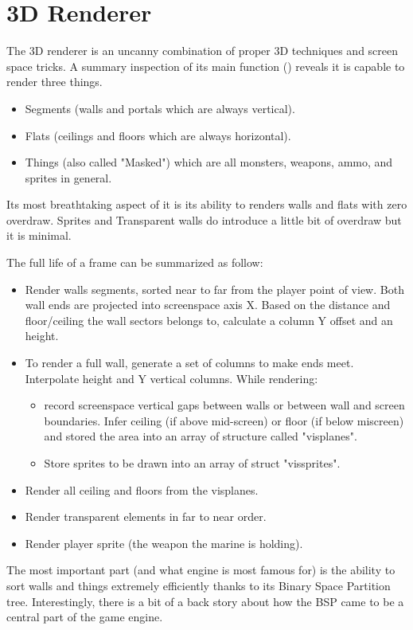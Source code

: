 \section{3D Renderer}
The 3D renderer is an uncanny combination of proper 3D techniques and screen space tricks. A summary inspection of its main function () reveals it is capable to render three things.\\
\par
{}
\par
\begin{itemize}
	\item Segments (walls and portals which are always vertical).
	\item Flats (ceilings and floors which are always horizontal).
	\item Things (also called "Masked") which are all monsters, weapons, ammo, and sprites in general.
\end{itemize}
 Its most breathtaking aspect of it is its ability to renders walls and flats with zero overdraw. Sprites and Transparent walls do introduce a little bit of overdraw but it is minimal.\\
\par
The full life of a frame can be summarized as follow:
\begin{itemize}
\item Render walls segments, sorted near to far from the player point of view. Both wall ends are projected into screenspace axis X. Based on the distance and floor/ceiling the wall sectors belongs to, calculate a column Y offset and an height. 
\item To render a full wall, generate a set of columns to make ends meet. Interpolate height and Y vertical columns. While rendering:
   \begin{itemize}
     \item record screenspace vertical gaps between walls or between wall and screen boundaries. Infer ceiling (if above mid-screen) or floor (if below miscreen) and stored the area into an array of structure called "visplanes".
     \item Store sprites to be drawn into an array of struct "vissprites".
   \end{itemize}      
\item Render all ceiling and floors from the visplanes.
\item Render transparent elements in far to near order.
\item Render player sprite (the weapon the marine is holding).
\end{itemize}
\par
The most important part (and what \doom engine is most famous for) is the ability to sort walls and things extremely efficiently thanks to its Binary Space Partition tree. Interestingly, there is a bit of a back story about how the BSP came to be a central part of the game engine.\\
\par
\pagebreak

